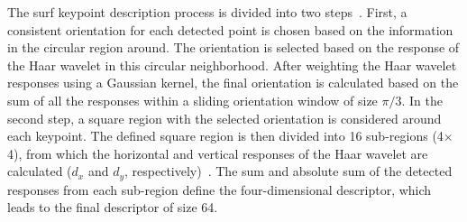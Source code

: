 \begin{description}
	The \ac{surf} keypoint description process is divided into two steps~\cite{bay2006surf}.
	First, a consistent orientation for each detected point is chosen based on the information in the circular region around.
	The orientation is selected based on the response of the Haar wavelet in this circular neighborhood.
	After weighting the Haar wavelet responses using a Gaussian kernel, the final orientation is calculated based on the sum of all the responses within a sliding orientation window of size $\pi/3$.
	In the second step, a square region with the selected orientation is considered around each keypoint.
	The defined square region is then divided into 16 sub-regions (4$\times$4), from which the horizontal and vertical responses of the Haar wavelet are calculated ($d_{x}$ and $d_{y}$, respectively)~\cite{bay2006surf}.
	The sum and absolute sum of the detected responses from each sub-region define the four-dimensional descriptor, which leads to the final descriptor of size 64.
	
\end{description}

